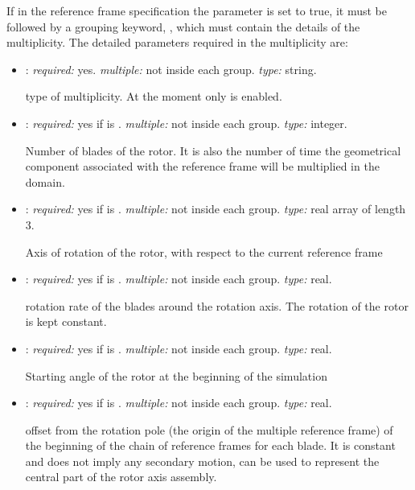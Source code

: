 If in the reference frame specification the parameter  is set to true, it must be followed by a grouping keyword, , which must contain the details of the multiplicity. The detailed parameters required in the multiplicity are:
\begin{itemize}
	\item {}: \textit{required:} yes. \textit{multiple:} not inside each  group. \textit{type:} string.
    
	type of multiplicity. At the moment only  is enabled.
    
    \item {}: \textit{required:} yes if  is . \textit{multiple:} not inside each  group. \textit{type:} integer.
    
    Number of blades of the rotor. It is also the number of time the geometrical component associated with the reference frame will be multiplied in the domain. 
    
    \item {}: \textit{required:} yes if  is . \textit{multiple:} not inside each  group. \textit{type:} real array of length 3.
    
    Axis of rotation of the rotor, with respect to the current reference frame
    
    \item {}: \textit{required:} yes if  is . \textit{multiple:} not inside each  group. \textit{type:} real.
    
    rotation rate of the blades around the rotation axis. The rotation of the rotor is kept constant.
    
    \item {}: \textit{required:} yes if  is . \textit{multiple:} not inside each  group. \textit{type:} real.
    
    Starting angle of the rotor at the beginning of the simulation
    
    \item {}: \textit{required:} yes if  is . \textit{multiple:} not inside each  group. \textit{type:} real. 
    
    offset from the rotation pole (the origin of the multiple reference frame) of the beginning of the chain of reference frames for each blade. It is constant and does not imply any secondary motion, can be used to represent the central part of the rotor axis assembly. 
    

\end{itemize}
